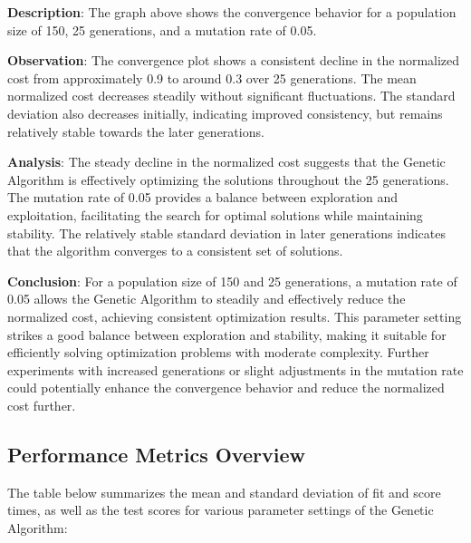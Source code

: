 \documentclass[
]{article}
\begin{document}
    \textbf{Description}: The graph above shows the convergence behavior for a population size of 150, 25 generations, and a mutation rate of 0.05.

    \textbf{Observation}: The convergence plot shows a consistent decline in the normalized cost from approximately 0.9 to around 0.3 over 25 generations. The mean normalized cost decreases steadily without significant fluctuations. The standard deviation also decreases initially, indicating improved consistency, but remains relatively stable towards the later generations.

    \textbf{Analysis}: The steady decline in the normalized cost suggests that the Genetic Algorithm is effectively optimizing the solutions throughout the 25 generations. The mutation rate of 0.05 provides a balance between exploration and exploitation, facilitating the search for optimal solutions while maintaining stability. The relatively stable standard deviation in later generations indicates that the algorithm converges to a consistent set of solutions.

    \textbf{Conclusion}: For a population size of 150 and 25 generations, a mutation rate of 0.05 allows the Genetic Algorithm to steadily and effectively reduce the normalized cost, achieving consistent optimization results. This parameter setting strikes a good balance between exploration and stability, making it suitable for efficiently solving optimization problems with moderate complexity. Further experiments with increased generations or slight adjustments in the mutation rate could potentially enhance the convergence behavior and reduce the normalized cost further.

    \subsection{Performance Metrics Overview}

    The table below summarizes the mean and standard deviation of fit and score times, as well as the test scores for various parameter settings of the Genetic Algorithm:
\end{document}
